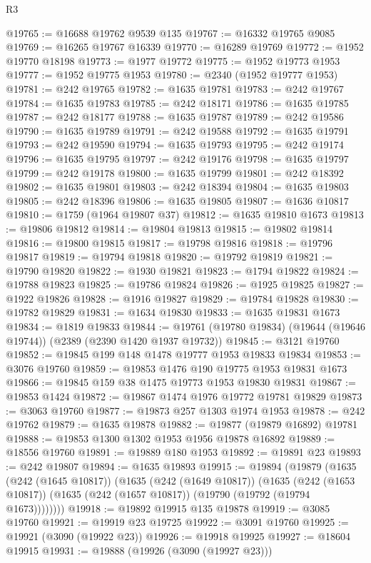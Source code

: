 \begin{lexlean}{R3}
\begin{coremodule}
@19765 := @16688 @19762 @9539 @135
@19767 := @16332 @19765 @9085
@19769 := @16265 @19767 @16339
@19770 := @16289 @19769
@19772 := @1952 @19770 @18198
@19773 := @1977 @19772
@19775 := @1952 @19773 @1953
@19777 := @1952 @19775 @1953
@19780 := @2340 (@1952 @19777 @1953)
@19781 := @242 @19765
@19782 := @1635 @19781
@19783 := @242 @19767
@19784 := @1635 @19783
@19785 := @242 @18171
@19786 := @1635 @19785
@19787 := @242 @18177
@19788 := @1635 @19787
@19789 := @242 @19586
@19790 := @1635 @19789
@19791 := @242 @19588
@19792 := @1635 @19791
@19793 := @242 @19590
@19794 := @1635 @19793
@19795 := @242 @19174
@19796 := @1635 @19795
@19797 := @242 @19176
@19798 := @1635 @19797
@19799 := @242 @19178
@19800 := @1635 @19799
@19801 := @242 @18392
@19802 := @1635 @19801
@19803 := @242 @18394
@19804 := @1635 @19803
@19805 := @242 @18396
@19806 := @1635 @19805
@19807 := @1636 @10817
@19810 := @1759 (@1964 @19807 @37)
@19812 := @1635 @19810 @1673
@19813 := @19806 @19812
@19814 := @19804 @19813
@19815 := @19802 @19814
@19816 := @19800 @19815
@19817 := @19798 @19816
@19818 := @19796 @19817
@19819 := @19794 @19818
@19820 := @19792 @19819
@19821 := @19790 @19820
@19822 := @1930 @19821
@19823 := @1794 @19822
@19824 := @19788 @19823
@19825 := @19786 @19824
@19826 := @1925 @19825
@19827 := @1922 @19826
@19828 := @1916 @19827
@19829 := @19784 @19828
@19830 := @19782 @19829
@19831 := @1634 @19830
@19833 := @1635 @19831 @1673
@19834 := @1819 @19833
@19844 := @19761 (@19780 @19834) (@19644 (@19646 @19744)) (@2389 (@2390 @1420 @1937 @19732))
@19845 := @3121 @19760
@19852 := @19845 @199 @148 @1478 @19777 @1953 @19833 @19834
@19853 := @3076 @19760
@19859 := @19853 @1476 @190 @19775 @1953 @19831 @1673
@19866 := @19845 @159 @38 @1475 @19773 @1953 @19830 @19831
@19867 := @19853 @1424
@19872 := @19867 @1474 @1976 @19772 @19781 @19829
@19873 := @3063 @19760
@19877 := @19873 @257 @1303 @1974 @1953
@19878 := @242 @19762
@19879 := @1635 @19878
@19882 := @19877 (@19879 @16892) @19781
@19888 := @19853 @1300 @1302 @1953 @1956 @19878 @16892
@19889 := @18556 @19760
@19891 := @19889 @180 @1953
@19892 := @19891 @23
@19893 := @242 @19807
@19894 := @1635 @19893
@19915 := @19894
    (@19879
      (@1635
        (@242 (@1645 @10817))
        (@1635
          (@242 (@1649 @10817))
          (@1635
            (@242 (@1653 @10817))
            (@1635 (@242 (@1657 @10817)) (@19790 (@19792 (@19794 @1673))))))))
@19918 := @19892 @19915 @135 @19878
@19919 := @3085 @19760
@19921 := @19919 @23 @19725
@19922 := @3091 @19760
@19925 := @19921 (@3090 (@19922 @23))
@19926 := @19918 @19925
@19927 := @18604 @19915
@19931 := @19888 (@19926 (@3090 (@19927 @23)))

\end{coremodule}
\end{lexlean}
